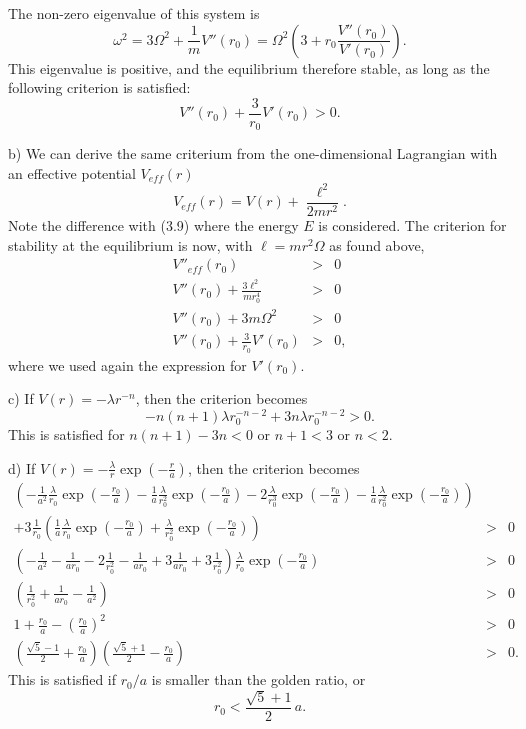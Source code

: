 \documentclass[letterpaper,11pt]{article}
\begin{document}
The non-zero eigenvalue of this system is
\begin{equation*}
 \omega^2 = 3 \Omega^2 + \frac{1}{m} V''(r_0) = \Omega^2 \left(3 + r_0 \frac{V''(r_0)}{V'(r_0)} \right).
\end{equation*}
This eigenvalue is positive, and the equilibrium therefore stable, as long as the following criterion is satisfied:
\begin{equation*}
 V''(r_0) + \frac{3}{r_0} V'(r_0) > 0.
\end{equation*}

b) We can derive the same criterium from the one-dimensional Lagrangian with an effective potential $V_{eff}(r)$
\begin{equation*}
 V_{eff}(r) = V(r) + \frac{\ell^2}{2 m r^2}.
\end{equation*}
Note the difference with (3.9) where the energy $E$ is considered.  The criterion for stability at the equilibrium is now, with $\ell = m r^2 \Omega$ as found above,
\begin{eqnarray*}
 V''_{eff}(r_0) & > & 0 \\
 V''(r_0) + \frac{3 \ell^2}{m r_0^4} & > & 0 \\
 V''(r_0) + 3 m \Omega^2 & > & 0 \\
 V''(r_0) + \frac{3}{r_0} V'(r_0) & > & 0,
\end{eqnarray*}
where we used again the expression for $V'(r_0)$.

c) If $V(r) = -\lambda r^{-n}$, then the criterion becomes
\begin{equation*}
 - n (n+1) \lambda r_0^{-n-2} + 3 n \lambda r_0^{-n-2} > 0.
\end{equation*}
This is satisfied for $n(n+1) - 3 n < 0$ or $n+1 < 3$ or $n < 2$.

d) If $V(r) = -\frac{\lambda}{r} \exp(-\frac{r}{a})$, then the criterion becomes
\begin{eqnarray*}
 \left( -\frac{1}{a^2} \frac{\lambda}{r_0} \exp(-\frac{r_0}{a}) - \frac{1}{a} \frac{\lambda}{r_0^2} \exp(-\frac{r_0}{a}) - 2 \frac{\lambda}{r_0^3} \exp(-\frac{r_0}{a}) - \frac{1}{a} \frac{\lambda}{r_0^2} \exp(-\frac{r_0}{a}) \right) & & \\
+ 3 \frac{1}{r_0} \left( \frac{1}{a} \frac{\lambda}{r_0} \exp(-\frac{r_0}{a}) + \frac{\lambda}{r_0^2} \exp(-\frac{r_0}{a}) \right) & > & 0 \\
 \left( -\frac{1}{a^2} - \frac{1}{a r_0} - 2 \frac{1}{r_0^2} - \frac{1}{a r_0} + 3 \frac{1}{a r_0} + 3 \frac{1}{r_0^2} \right) \frac{\lambda}{r_0} \exp(-\frac{r_0}{a}) & > & 0 \\
 \left( \frac{1}{r_0^2} + \frac{1}{a r_0} - \frac{1}{a^2}\right) & > & 0 \\
 1 + \frac{r_0}{a} - \left(\frac{r_0}{a}\right)^2 & > & 0 \\
 \left( \frac{\sqrt{5} - 1}{2} + \frac{r_0}{a} \right) \left( \frac{\sqrt{5} + 1}{2} - \frac{r_0}{a} \right) & > & 0.
\end{eqnarray*}
This is satisfied if $r_0/a$ is smaller than the golden ratio, or
\begin{equation*}
 r_0 < \frac{\sqrt{5} + 1}{2} \, a.
\end{equation*}
\end{document}
